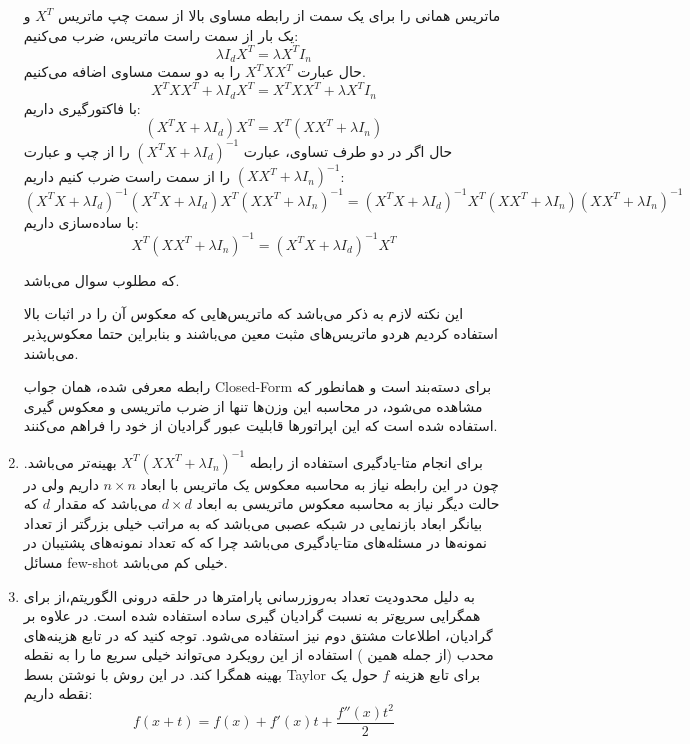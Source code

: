 \documentclass{article}
\begin{document}
\begin{enumerate}
	ماتریس همانی را برای یک سمت از رابطه مساوی بالا از سمت چپ ماتریس 
	${X^T}$
	و یک بار از سمت راست ماتریس،‌ ضرب می‌کنیم:
	$$
	\lambda {I_d}{X^T} = \lambda {X^T}{I_n}
	$$
	حال عبارت
	${X^T}X{X^T}$
	را به دو سمت مساوی اضافه می‌کنیم.
	$$
	{X^T}X{X^T} + \lambda {I_d}{X^T} = {X^T}X{X^T} + \lambda {X^T}{I_n}
	$$
	با فاکتورگیری داریم:
	$$
	\left( {{X^T}X + \lambda {I_d}} \right){X^T} = {X^T}\left( {X{X^T} + \lambda {I_n}} \right)
	$$
	حال اگر در دو طرف تساوی، عبارت
	${\left( {{X^T}X + \lambda {I_d}} \right)^{ - 1}}$
	را از چپ و عبارت
	${\left( {X{X^T} + \lambda {I_n}} \right)^{ - 1}}$
	را از سمت راست ضرب کنیم داریم:
	$$
	{\left( {{X^T}X + \lambda {I_d}} \right)^{ - 1}}\left( {{X^T}X + \lambda {I_d}} \right){X^T}{\left( {X{X^T} + \lambda {I_n}} \right)^{ - 1}} = {\left( {{X^T}X + \lambda {I_d}} \right)^{ - 1}}{X^T}\left( {X{X^T} + \lambda {I_n}} \right){\left( {X{X^T} + \lambda {I_n}} \right)^{ - 1}}
	$$
	با ساده‌سازی داریم:
	$$
	{X^T}{\left( {X{X^T} + \lambda {I_n}} \right)^{ - 1}} = {\left( {{X^T}X + \lambda {I_d}} \right)^{ - 1}}{X^T}
	$$
	
	که مطلوب سوال می‌باشد. 
	
		این نکته لازم به ذکر می‌باشد که ماتریس‌هایی که معکوس آن را در اثبات بالا استفاده کردیم هردو ماتریس‌های مثبت ‌معین می‌باشند و بنابراین حتما معکوس‌پذیر می‌باشند.
	
	رابطه معرفی شده، همان جواب Closed-Form برای دسته‌بند 
	است و همانطور که مشاهده می‌شود، در محاسبه این وزن‌ها تنها از ضرب ماتریسی و معکوس گیری استفاده شده است که این‌ اپراتورها قابلیت عبور گرادیان از خود را فراهم می‌کنند.
	
\item
	
	برای انجام متا-یادگیری استفاده از رابطه
	${X^T}{\left( {X{X^T} + \lambda {I_n}} \right)^{ - 1}}$
	بهینه‌تر می‌باشد. چون در این رابطه نیاز به محاسبه معکوس یک ماتریس با ابعاد
	$n \times n$
	داریم ولی در حالت دیگر نیاز به محاسبه معکوس ماتریسی به ابعاد
	$d \times d$
	می‌باشد که مقدار $d$ که بیانگر ابعاد بازنمایی در شبکه عصبی می‌باشد که به مراتب خیلی بزرگتر از تعداد نمونه‌ها در مسئله‌های متا-یادگیری می‌باشد چرا که که تعداد نمونه‌های پشتیبان در مسائل few-shot خیلی کم می‌باشد.
	
	\item
	به دلیل محدودیت تعداد به‌روزرسانی پارامترها در حلقه درونی الگوریتم،‌از
	برای همگرایی سریع‌تر به نسبت گرادیان گیری ساده استفاده شده است.
	در
	علاوه بر گرادیان،‌ اطلاعات مشتق دوم نیز استفاده می‌شود. توجه کنید که در تابع هزینه‌های محدب (از جمله همین 
	)
	استفاده از این رویکرد می‌تواند خیلی سریع ما را به نقطه بهینه همگرا کند.
	در این روش با نوشتن بسط Taylor برای تابع هزینه 
	$f$
	حول یک نقطه داریم:
	$$
	f\left( {x + t} \right) = f\left( x \right) + f'\left( x \right)t + \frac{{f''\left( x \right){t^2}}}{2}
	$$
	

\end{enumerate}
\end{document}
